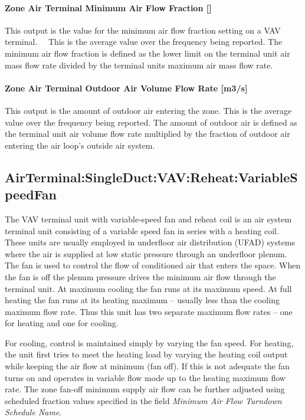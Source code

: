 \paragraph{Zone Air Terminal Minimum Air Flow Fraction {[]}}\label{zone-air-terminal-minimum-air-flow-fraction}

This output is the value for the minimum air flow fraction setting on a VAV terminal.~~ This is the average value over the frequency being reported. The minimum air flow fraction is defined as the lower limit on the terminal unit air mass flow rate divided by the terminal units maximum air mass flow rate.

\paragraph{Zone Air Terminal Outdoor Air Volume Flow Rate {[}m3/s{]}}

This output is the amount of outdoor air entering the zone. This is the average value over the frequency being reported. The amount of outdoor air is defined as the terminal unit air volume flow rate multiplied by the fraction of outdoor air entering the air loop's outside air system.

\subsection{AirTerminal:SingleDuct:VAV:Reheat:VariableSpeedFan}\label{airterminalsingleductvavreheatvariablespeedfan}

The VAV terminal unit with variable-speed fan and reheat coil is an air system terminal unit consisting of a variable speed fan in series with a heating coil. These units are usually employed in underfloor air distribution (UFAD) systems where the air is supplied at low static pressure through an underfloor plenum. The fan is used to control the flow of conditioned air that enters the space. When the fan is off the plenum pressure drives the minimum air flow through the terminal unit. At maximum cooling the fan runs at its maximum speed. At full heating the fan runs at its heating maximum -- usually less than the cooling maximum flow rate. Thus this unit has two separate maximum flow rates -- one for heating and one for cooling.

For cooling, control is maintained simply by varying the fan speed. For heating, the unit first tries to meet the heating load by varying the heating coil output while keeping the air flow at minimum (fan off). If this is not adequate the fan turns on and operates in variable flow mode up to the heating maximum flow rate. The zone fan-off minimum supply air flow can be further adjusted using scheduled fraction values specified in the field \textit{Minimum Air Flow Turndown Schedule Name}.

